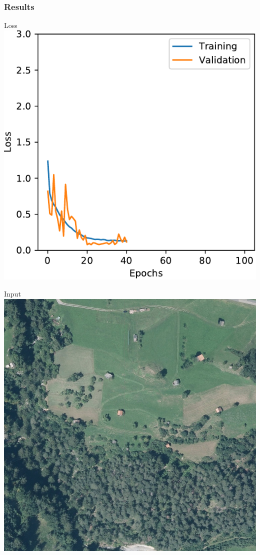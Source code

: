 \documentclass[usenames,dvipsnames,10pt]{beamer}
\begin{document}
\begin{frame}
\frametitle{Results}
\begin{minipage}[]{0.3\textwidth}
	\centering
	Loss
	\includegraphics[width=\textwidth]{graphics/loss05.pdf}
\end{minipage}
\hspace{0.25cm}
\begin{minipage}[]{0.3\textwidth}
	\centering
	Input
	\includegraphics[width=\textwidth]{graphics/aerial05.jpg}

\end{minipage}
\end{frame}
\end{document}
